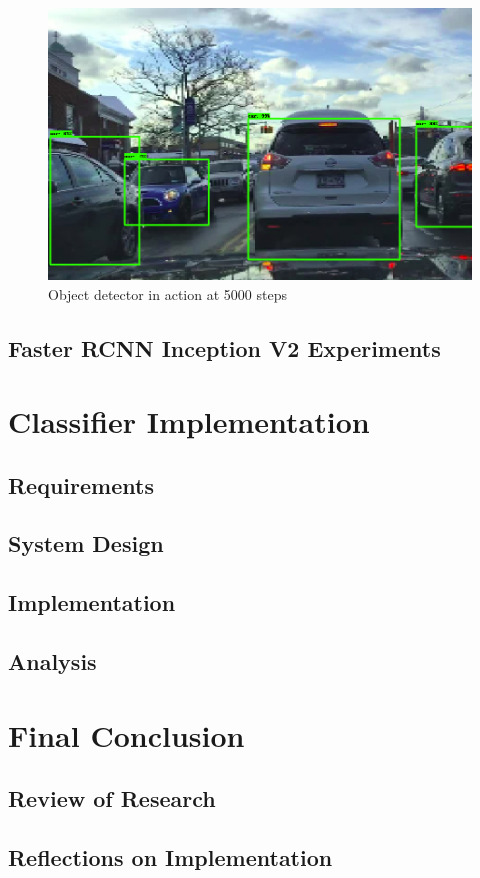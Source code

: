 \documentclass[12pt]{report}
\begin{document}
\vspace{0.5cm}
\begin{figure}[h]
	\centering
	\includegraphics[width=15cm]{classes-smalldata-5k}
	\caption{Object detector in action at 5000 steps}
	\label{fig:class-smalldata-5k}
\end{figure}

\newpage
\section{Faster RCNN Inception V2 Experiments}


\chapter{Classifier Implementation}
\section{Requirements}
\section{System Design}
\section{Implementation}
\section{Analysis}

\newpage
\chapter{Final Conclusion}
\section{Review of Research}
\section{Reflections on Implementation}

\printbibliography
\end{document}
